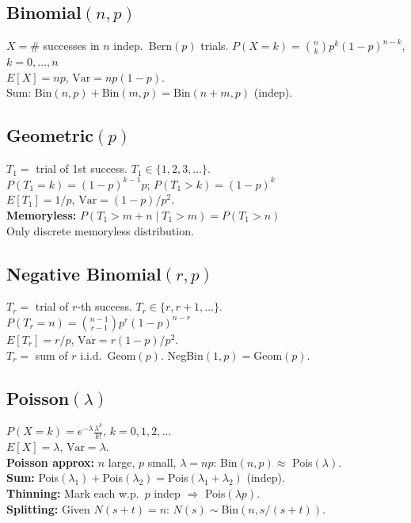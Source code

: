 \documentclass[6pt]{article}
\newcommand{\hi}[1]{\colorbox{yellow!25}{\ensuremath{#1}}}
\newcommand{\hitext}[1]{\colorbox{yellow!25}{#1}}
\begin{document}
\begin{multicols}{4}
\subsection{Binomial$(n,p)$}
$X=\#$ successes in $n$ indep.\ Bern$(p)$ trials.
\hi{P(X{=}k)=\binom{n}{k}p^k(1{-}p)^{n-k}}, $k=0,\ldots,n$\\
\hi{E[X]=np}, $\text{Var}=np(1{-}p)$.\\
Sum: $\text{Bin}(n,p)+\text{Bin}(m,p)=\text{Bin}(n{+}m,p)$ (indep).

\subsection{Geometric$(p)$}
$T_1=$ trial of 1st success. $T_1\in\{1,2,3,\ldots\}$.\\
\hi{P(T_1{=}k)=(1{-}p)^{k-1}p};\; \hi{P(T_1>k)=(1{-}p)^k}\\
\hi{E[T_1]=1/p}, $\text{Var}=(1{-}p)/p^2$.\\
\hitext{\textbf{Memoryless:} $P(T_1>m{+}n\mid T_1>m)=P(T_1>n)$}\\
Only discrete memoryless distribution.

\subsection{Negative Binomial$(r,p)$}
$T_r=$ trial of $r$-th success. $T_r\in\{r,r{+}1,\ldots\}$.\\
$P(T_r{=}n)=\binom{n-1}{r-1}p^r(1{-}p)^{n-r}$\\
$E[T_r]=r/p$, $\text{Var}=r(1{-}p)/p^2$.\\
$T_r = $ sum of $r$ i.i.d.\ Geom$(p)$. NegBin$(1,p)=$Geom$(p)$.

\subsection{Poisson$(\lambda)$}
\hi{P(X{=}k)=e^{-\lambda}\frac{\lambda^k}{k!}}, $k=0,1,2,\ldots$\\
\hi{E[X]=\lambda}, $\text{Var}=\lambda$.\\
\textbf{Poisson approx:} $n$ large, $p$ small, $\lambda=np$: Bin$(n,p)\approx$ Pois$(\lambda)$.\\
\textbf{Sum:} Pois$(\lambda_1)+$Pois$(\lambda_2)=$Pois$(\lambda_1{+}\lambda_2)$ (indep).\\
\textbf{Thinning:} Mark each w.p.\ $p$ indep $\Rightarrow$ Pois$(\lambda p)$.\\
\textbf{Splitting:} Given $N(s{+}t)=n$: $N(s)\sim$Bin$(n,s/(s{+}t))$.


\end{multicols}
\end{document}
